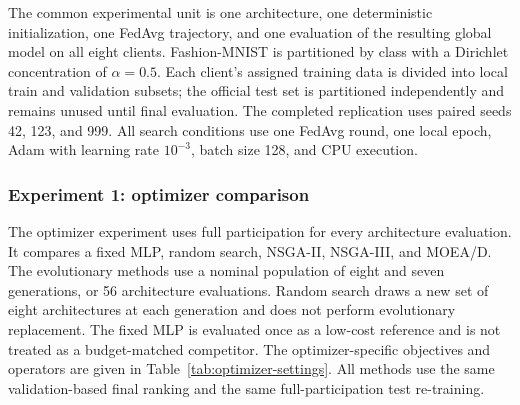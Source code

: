 \documentclass[11pt]{article}
\begin{document}
The common experimental unit is one architecture, one deterministic initialization, one FedAvg trajectory, and one evaluation of the resulting global model on all eight clients. Fashion-MNIST is partitioned by class with a Dirichlet concentration of $\alpha=0.5$. Each client's assigned training data is divided into local train and validation subsets; the official test set is partitioned independently and remains unused until final evaluation. The completed replication uses paired seeds 42, 123, and 999. All search conditions use one FedAvg round, one local epoch, Adam with learning rate $10^{-3}$, batch size 128, and CPU execution.

\subsubsection{Experiment 1: optimizer comparison}

The optimizer experiment uses full participation for every architecture evaluation. It compares a fixed MLP, random search, NSGA-II, NSGA-III, and MOEA/D. The evolutionary methods use a nominal population of eight and seven generations, or 56 architecture evaluations. Random search draws a new set of eight architectures at each generation and does not perform evolutionary replacement. The fixed MLP is evaluated once as a low-cost reference and is not treated as a budget-matched competitor. The optimizer-specific objectives and operators are given in Table~\ref{tab:optimizer-settings}. All methods use the same validation-based final ranking and the same full-participation test re-training.

\begin{table}[t]
\centering
\caption{Optimizer conditions in the full-participation experiment. The objectives are written in minimization form.}
\label{tab:optimizer-settings}
\scriptsize
{}
\end{table}
\end{document}
